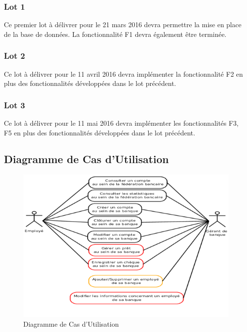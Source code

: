 \subsubsection{Lot 1}

Ce premier lot à délivrer pour le 21 mars 2016 devra permettre la mise en place de la base de données. La fonctionnalité F1 devra également être terminée.

\subsubsection{Lot 2}

Ce lot à délivrer pour le 11 avril 2016 devra implémenter la fonctionnalité F2 en plus des fonctionnalités développées dans le lot précédent.


\subsubsection{Lot 3}

Ce lot à délivrer pour le 11 mai 2016 devra implémenter les fonctionnalités F3{\color{red}{, F4}}, F5 {\color{red}{et F6}} en plus des fonctionnalités développées dans le lot précédent.

\subsection{Diagramme de Cas d'Utilisation}

\begin{figure}[!h]
\begin{center}

   \caption{\label{} Diagramme de Cas d'Utilisation}
   \includegraphics[scale=0.65]{images/CasUtilisation2.png}
   \centering
 
\end{center}  
\end{figure}

